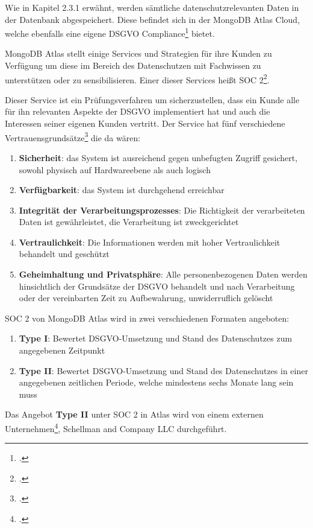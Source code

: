Wie in Kapitel 2.3.1 erwähnt, werden sämtliche datenschutzrelevanten Daten in der Datenbank abgespeichert. Diese befindet sich in der MongoDB Atlas Cloud, welche ebenfalls eine eigene DSGVO Compliance\footcite{atlas-dsgvo-com} bietet.

MongoDB Atlas stellt einige Services und Strategien für ihre Kunden zu Verfügung um diese im Bereich des Datenschutzen mit Fachwissen zu unterstützen oder zu sensibilisieren. Einer dieser Services heißt SOC 2\footcite{atlas-soc2}.

Dieser Service ist ein Prüfungsverfahren um sicherzustellen, dass ein Kunde alle für ihn relevanten Aspekte der DSGVO implementiert hat und auch die Interessen seiner eigenen Kunden vertritt. Der Service hat fünf verschiedene
Vertrauensgrundsätze\footcite{atlas-soc2} die da wären:
\begin{enumerate}
	\item \textbf{Sicherheit}: das System ist ausreichend gegen unbefugten Zugriff gesichert, sowohl physisch auf Hardwareebene als auch logisch
	\item \textbf{Verfügbarkeit}: das System ist durchgehend erreichbar
	\item \textbf{Integrität der Verarbeitungsprozesses}: Die Richtigkeit der verarbeiteten Daten ist gewährleistet, die Verarbeitung ist zweckgerichtet
	\item \textbf{Vertraulichkeit}: Die Informationen werden mit hoher Vertraulichkeit behandelt und geschützt
	\item \textbf{Geheimhaltung und Privatsphäre}: Alle personenbezogenen Daten werden hinsichtlich der Grundsätze der DSGVO behandelt und nach Verarbeitung oder der vereinbarten Zeit zu Aufbewahrung, unwiderruflich gelöscht
\end{enumerate}
SOC 2 von MongoDB Atlas wird in zwei verschiedenen Formaten angeboten:
\begin{enumerate}
	\item \textbf{Type I}: Bewertet DSGVO-Umsetzung und Stand des Datenschutzes zum angegebenen Zeitpunkt 
	\item \textbf{Type II}: Bewertet DSGVO-Umsetzung und Stand des Datenschutzes in einer angegebenen zeitlichen Periode, welche mindestens sechs Monate lang sein muss
\end{enumerate}
Das Angebot \textbf{Type II} unter SOC 2 in Atlas wird von einem externen Unternehmen\footcite{atlas-soc2}, Schellman and Company LLC durchgeführt.
\newpage